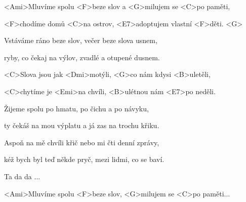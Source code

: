 

\zs
<Ami>Mluvíme spolu <F>beze slov a <G>milujem se <C>po paměti,

<F>chodíme domů <C>na ostrov, <E7>adoptujem vlastní <F>děti. <G>
\ks

\zs
Vstáváme ráno beze slov, večer beze slova usnem,

ryby, co čekaj na výlov, zvadlé a otupené dusnem.
\ks

\zr
<C>Slova jsou jak <Dmi>motýli, <G>co nám kdysi <B>uletěli,

<C>chytíme je <Emi>na chvíli, <B>ulétnou nám <E7>po neděli.
\kr

\zs
Žijeme spolu po hmatu, po čichu a po návyku,

ty čekáš na mou výplatu a já zas na trochu křiku.
\ks

\zs
Aspoň na mě chvíli křič nebo mi čti denní zprávy,

kéž bych byl teď někde pryč, mezi lidmi, co se baví.
\ks

\zr Ta da da ... \kr

\zs
<Ami>Mluvíme spolu <F>beze slov, <G>milujem se <C>po paměti...
\ks

\kp
